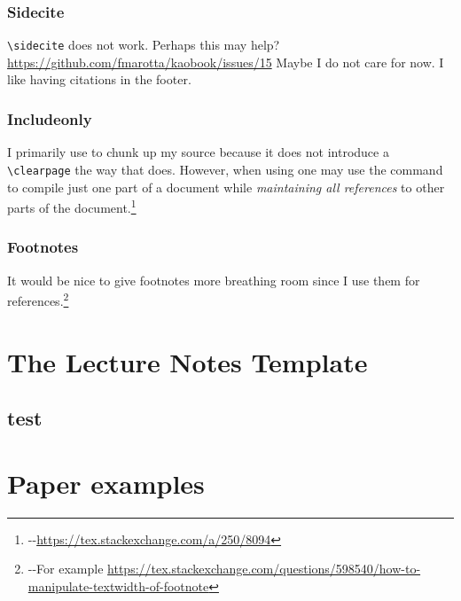 \documentclass[12pt, oneside]{report}    %
\let\svfootnote\footnote
\def\footnote#1{\svfootnote{\rightskip\dimexpr
  -\marginparsep-\marginparwidth #1}}
\let\oldsection\section
\def\section{%
  \setcounter{sidenote}{1}%
  \oldsection
}
\begin{document}
\subsection{Sidecite}
\verb!\sidecite! does not work. Perhaps this may help?
\url{https://github.com/fmarotta/kaobook/issues/15} Maybe I do not care for now. I like having citations in the footer.


\subsection{Includeonly}

I primarily use \verb!! to chunk up my source because it does not introduce a \verb!\clearpage! the way that \verb!! does. However, when using \verb!! one may use the \verb!! command to compile just one part of a document while \emph{maintaining all references} to other parts of the document.\footnote{\url{https://tex.stackexchange.com/a/250/8094}} 

\subsection{Footnotes}

It would be nice to give footnotes more breathing room since I use them for references.\footnote{For example \url{https://tex.stackexchange.com/questions/598540/how-to-manipulate-textwidth-of-footnote}}

\chapter{The Lecture Notes Template}


\section{test}
\lipsum[2]




\chapter{Paper examples}



% 

% 
% 
% 
\end{document}

